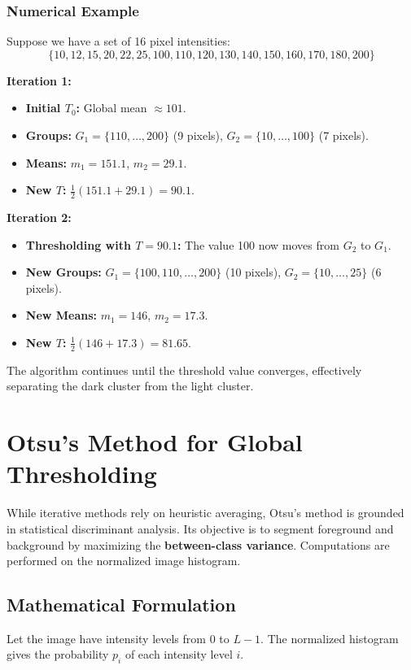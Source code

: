 \documentclass{report}
\begin{document}
\subsection{Numerical Example}
Suppose we have a set of 16 pixel intensities:
\[ \{10, 12, 15, 20, 22, 25, 100, 110, 120, 130, 140, 150, 160, 170, 180, 200\} \]

\textbf{Iteration 1:}
\begin{itemize}
    \item \textbf{Initial $T_0$:} Global mean $\approx 101$.
    \item \textbf{Groups:} $G_1 = \{110, \dots, 200\}$ (9 pixels), $G_2 = \{10, \dots, 100\}$ (7 pixels).
    \item \textbf{Means:} $m_1 = 151.1$, $m_2 = 29.1$.
    \item \textbf{New $T$:} $\frac{1}{2}(151.1 + 29.1) = 90.1$.
\end{itemize}

\textbf{Iteration 2:}
\begin{itemize}
    \item \textbf{Thresholding with $T = 90.1$:} The value 100 now moves from $G_2$ to $G_1$.
    \item \textbf{New Groups:} $G_1 = \{100, 110, \dots, 200\}$ (10 pixels), $G_2 = \{10, \dots, 25\}$ (6 pixels).
    \item \textbf{New Means:} $m_1 = 146$, $m_2 = 17.3$.
    \item \textbf{New $T$:} $\frac{1}{2}(146 + 17.3) = 81.65$.
\end{itemize}
The algorithm continues until the threshold value converges, effectively separating the dark cluster from the light cluster.

\chapter{Otsu's Method for Global Thresholding}

While iterative methods rely on heuristic averaging, Otsu's method is grounded in statistical discriminant analysis. Its objective is to segment foreground and background by maximizing the \textbf{between-class variance}. Computations are performed on the normalized image histogram.

\section{Mathematical Formulation}
Let the image have intensity levels from $0$ to $L-1$. The normalized histogram gives the probability $p_i$ of each intensity level $i$.
\end{document}
